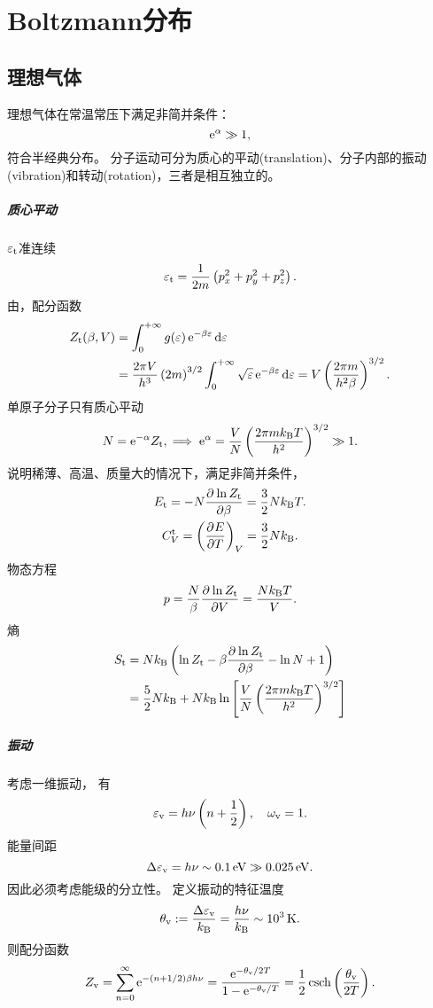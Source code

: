 \chapter{Boltzmann分布}
\section{理想气体}
理想气体在常温常压下满足非简并条件：
\[
	\mathop{}\!\mathrm{e}^\alpha\gg 1,
\]
符合半经典分布。%
分子运动可分为质心的平动(translation)、分子内部的振动(vibration)和转动(rotation)，三者是相互独立的。
\paragraph{质心平动}
$\varepsilon_\mathrm t$准连续
\[
	\varepsilon_\mathrm t=\frac1{2m}\left(p_x^2+p_y^2+p_z^2\right).
\]
由，配分函数
\begin{align}\notag
	Z_\mathrm t(\beta,V) & =\int_0^{+\infty} g(\varepsilon)\mathop{}\!\mathrm{e}^{-\beta\varepsilon}\mathop{}\!\mathrm{d}\varepsilon                                                                      \\
	               & =\frac{2\pi V}{h^3}\left(2m\right)^{3/2}\int_0^{+\infty}\sqrt\varepsilon\mathop{}\!\mathrm{e}^{-\beta\varepsilon}\mathop{}\!\mathrm{d}\varepsilon=V\left(\frac{2\pi m}{h^2\beta}\right)^{3/2}.
\end{align}
单原子分子只有质心平动
\[
	N=\mathop{}\!\mathrm{e}^{-\alpha}Z_\mathrm t,\implies\mathop{}\!\mathrm{e}^{\alpha}=\frac VN\left(\frac{2\pi mk_{\mathrm B} T}{h^2}\right)^{3/2}\gg 1.
\]
说明稀薄、高温、质量大的情况下，满足非简并条件，
\begin{gather}
	E_\mathrm t=-N\frac{\partial^{{}}\ln Z_\mathrm t}{\partial{\beta}^{{}}}=\frac32Nk_{\mathrm B} T.\\
	C_V^\mathrm t=\left(\frac{\partial^{{}}E}{\partial{T}^{{}}}\right)_V=\frac32Nk_{\mathrm B}.
\end{gather}
物态方程
\begin{align}
	p=\frac N\beta\frac{\partial^{{}}\ln Z_\mathrm t}{\partial{V}^{{}}}=\frac{Nk_{\mathrm B} T}V.
\end{align}
熵
\begin{align}\notag
	S_\mathrm t & =Nk_{\mathrm B}\left(\ln Z_\mathrm t-\beta\frac{\partial^{{}}\ln Z_\mathrm t}{\partial{\beta}^{{}}}-\ln N+1\right)                 \\
	      & =\frac52Nk_{\mathrm B}+Nk_{\mathrm B}\ln\left[\frac VN\left(\frac{2\pi mk_{\mathrm B} T}{h^2}\right)^{3/2}\right]
\end{align}
\paragraph{振动}
考虑一维振动，%
有
\[
	\varepsilon_\mathrm v=h\nu\left(n+\frac12\right),\quad\omega_\mathrm v=1.
\]
能量间距
\[
	\Delta\varepsilon_\mathrm v=h\nu\sim\SI{0.1}\electronvolt\gg\SI{0.025}\electronvolt.
\]
因此必须考虑能级的分立性。
定义振动的特征温度
\[
	\theta_\vb:=\frac{\D\varepsilon_\vb}\kB=\frac{h\nu}\kB\sim\SI{e3}\K.
\]
则配分函数
\begin{align}
	Z_\mathrm v=\sum_{n=0}^\infty\mathop{}\!\mathrm{e}^{-(n+1/2)\beta h\nu}=\frac{\mathop{}\!\mathrm{e}^{-\theta_\mathrm v/2T}}{1-\mathop{}\!\mathrm{e}^{-\theta_\mathrm v/T}}=\frac12\operatorname{csch}\left(\frac{\theta_\mathrm v}{2T}\right).
\end{align}

